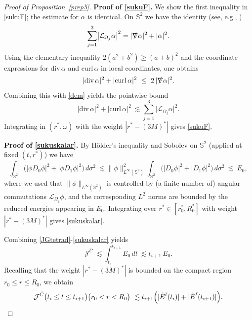 \documentclass[11pt]{article}
\numberwithin{equation}{section}
\theoremstyle{plain}
\theoremstyle{definition}
\theoremstyle{remark}
\begin{document}
\begin{proof}[Proof of Proposition~\ref{prep5}]
\medskip
\noindent\textbf{Proof of \eqref{sukuF}.}
We show the first inequality in \eqref{sukuF}; the estimate for $\underline{\alpha}$ is identical.
On $\mathbb S^{2}$ we have the identity (see, e.g., \cite[Appendix]{mokdad})
\begin{equation}\label{dem}
\sum_{j=1}^{3}\bigl|\mathcal{L}_{\Omega_j}\alpha\bigr|^{2}
=
|\slashed\nabla \alpha|^{2}+|\alpha|^{2}.
\end{equation}
Using the elementary inequality $2(a^{2}+b^{2})\ge (a\pm b)^{2}$ and the coordinate expressions for $\mathrm{div}\,\alpha$ and $\mathrm{curl}\,\alpha$ in local coordinates, one obtains
\begin{equation}
|\mathrm{div}\,\alpha|^{2}+|\mathrm{curl}\,\alpha|^{2}\ \le\ 2\,|\slashed\nabla\alpha|^{2}.
\end{equation}
Combining this with \eqref{dem} yields the pointwise bound
\begin{equation}
|\mathrm{div}\,\alpha|^{2}+|\mathrm{curl}\,\alpha|^{2}
\ \lesssim
\sum_{j=1}^{3}\bigl|\mathcal{L}_{\Omega_j}\alpha\bigr|^{2}.
\end{equation}
Integrating in $(r^{\ast},\omega)$ with the weight $|r^{\ast}-(3M)^{\ast}|$ gives \eqref{sukuF}.

\medskip
\noindent\textbf{Proof of \eqref{sukuskalar}.}
By H\"older's inequality and Sobolev on $\mathbb S^{2}$ (applied at fixed $(t,r^{\ast})$) we have
\begin{equation}
\int_{\mathbb S^{2}}\bigl(|\phi D_{0}\phi|^{2}+|\phi D_{1}\phi|^{2}\bigr)\,d\sigma^{2}
\ \lesssim
\|\phi\|_{L^{\infty}(\mathbb S^{2})}^{2}
\int_{\mathbb S^{2}}\bigl(|D_{0}\phi|^{2}+|D_{1}\phi|^{2}\bigr)\,d\sigma^{2}
\ \lesssim\ E_{0},
\end{equation}
where we used that $\|\phi\|_{L^{\infty}(\mathbb S^{2})}$ is controlled by (a finite number of) angular commutations $\mathcal L_{\Omega_j}\phi$, and the corresponding $L^{2}$ norms are bounded by the reduced energies appearing in $E_{0}$.
Integrating over $r^{\ast}\in[r_{0}^{\ast},R_{0}^{\ast}]$ with weight $|r^{\ast}-(3M)^{\ast}|$ gives \eqref{sukuskalar}.

\medskip
Combining \eqref{JGtetrad}-\eqref{sukuskalar} yields
\begin{equation}\label{ineqJG}
\mathcal{J}^{\hat{C}}
\ \lesssim
\int_{t_i}^{t_{i+1}}E_{0}\,dt
\ \lesssim
t_{i+1}\,E_{0}.
\end{equation}
Recalling that the weight $|r^{\ast}-(3M)^{\ast}|$ is bounded on the compact region $r_{0}\le r\le R_{0}$, we obtain
\begin{equation}\label{es2}
\mathcal{J}^{\hat{C}}\bigl(t_{i}\le t\le t_{i+1}\bigr)\bigl(r_{0}<r<R_{0}\bigr)
\ \lesssim
t_{i+1}\Bigl(|\tilde E^{\hat t}(t_{i})|+|\tilde E^{\hat t}(t_{i+1})|\Bigr).
\end{equation}


\end{proof}
\end{document}
